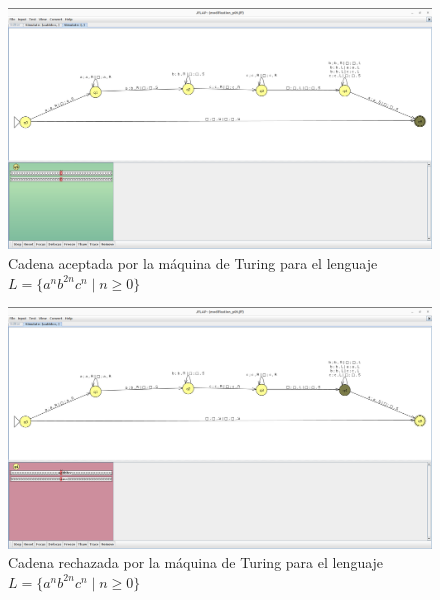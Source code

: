 \documentclass[11pt]{report}
\begin{document}
\begin{figure}[H]
  \centering
  \includegraphics[scale=0.25]{img/MT_modification_test_2.png }
  \caption{Cadena aceptada por la máquina de Turing para el lenguaje $L = \{a^nb^{2n}c^n \mid n \geq 0\}$}
\end{figure}

\begin{figure}[H]
  \centering
  \includegraphics[scale=0.25]{img/MT_modification_test_3.png }
  \caption{Cadena rechazada por la máquina de Turing para el lenguaje $L = \{a^nb^{2n}c^n \mid n \geq 0\}$}
\end{figure}
\end{document}
